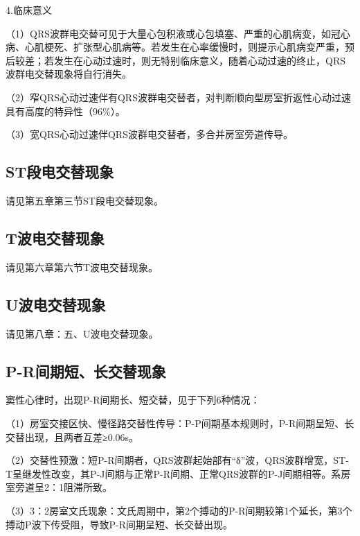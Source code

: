 4.临床意义

（1）QRS波群电交替可见于大量心包积液或心包填塞、严重的心肌病变，如冠心病、心肌梗死、扩张型心肌病等。若发生在心率缓慢时，则提示心肌病变严重，预后较差；若发生在心动过速时，则无特别临床意义，随着心动过速的终止，QRS波群电交替现象将自行消失。

（2）窄QRS心动过速伴有QRS波群电交替者，对判断顺向型房室折返性心动过速具有高度的特异性（96\%）。

（3）宽QRS心动过速伴QRS波群电交替者，多合并房室旁道传导。

\protect\hypertarget{text00046.htmlux5cux23subid513}{}{}

\subsection{ST段电交替现象}

请见第五章第三节ST段电交替现象。

\protect\hypertarget{text00046.htmlux5cux23subid514}{}{}

\subsection{T波电交替现象}

请见第六章第六节T波电交替现象。

\protect\hypertarget{text00046.htmlux5cux23subid515}{}{}

\subsection{U波电交替现象}

请见第八章：五、U波电交替现象。

\protect\hypertarget{text00046.htmlux5cux23subid516}{}{}

\subsection{P-R间期短、长交替现象}

窦性心律时，出现P-R间期长、短交替，见于下列6种情况：

（1）房室交接区快、慢径路交替性传导：P-P间期基本规则时，P-R间期呈短、长交替出现，且两者互差≥0.06s。

（2）交替性预激：短P-R间期者，QRS波群起始部有“δ”波，QRS波群增宽，ST-T呈继发性改变，其P-J间期与正常P-R间期、正常QRS波群的P-J间期相等。系房室旁道呈2：1阻滞所致。

（3）3：2房室文氏现象：文氏周期中，第2个搏动的P-R间期较第1个延长，第3个搏动P波下传受阻，导致P-R间期呈短、长交替出现。

